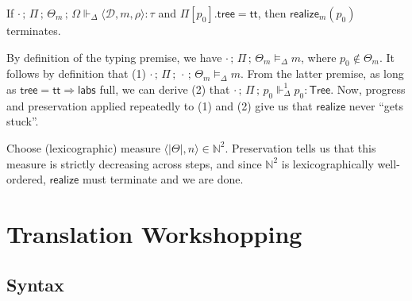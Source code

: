 \documentclass{article}
\newcommand{\mf}[1]{\mathsf{#1}}
\newcommand{\mc}[1]{\mathcal{#1}}
\newcommand{\semi}{\,;\,}
\newcommand{\hl}[1]{\colorbox{LightGoldenrod1}{#1}}
\newcommand{\pair}[2]{\langle #1, #2 \rangle}
\newcommand{\trip}[3]{\langle #1, #2, #3 \rangle}
\newcommand{\rtp}{\tau}
\newcommand{\tmeml}[4]{#1 \semi #2 \semi #3 \vDash_\Delta #4}
\newcommand{\tcfgl}[8]{#1 \semi #2 \semi #3 \semi #4 \Vdash_\Delta \trip{#5}{#6}{#7} : #8}
\newcommand{\ttree}{\mf{Tree}}
\renewcommand{\tt}{\mf{tt}}
\newcommand{\D}{\mc{D}}
\begin{document}
\begin{theorem}
If $\tcfgl{\cdot}{\Pi}{\Theta_m}{\Omega}{\D}{m}{\rho}{\rtp}$
and $\Pi[p_0].\mf{tree} = \tt$,
then $\mf{realize}_m(p_0)$ terminates.

\begin{Proof}
By definition of the typing premise,
we have $\tmeml{\cdot}{\Pi}{\Theta_m}{m}$,
where $p_0 \notin \Theta_m$.
It follows by definition that (1)
$\cdot \semi \Pi \semi \cdot \semi \Theta_m \vDash_\Delta m$.
From the latter premise, 
\hl{as long as $\mf{tree}=\tt \Rightarrow \mf{labs}$ full},
we can derive
(2) that $\cdot \semi \Pi \semi p_0 \Vdash^1_\Delta p_0: \ttree$.
Now, progress and preservation applied repeatedly to (1) and (2)
give us that $\mf{realize}$ never ``gets stuck''.

Choose (lexicographic) measure $\pair{|\Theta|}{n} \in \mathbb{N}^2$.
Preservation tells us that this measure is strictly decreasing
across steps, and since $\mathbb{N}^2$ is lexicographically well-ordered,
$\mf{realize}$ must terminate and we are done.
\end{Proof}
\end{theorem}

\section{Translation Workshopping}

\subsection{Syntax}
\end{document}
